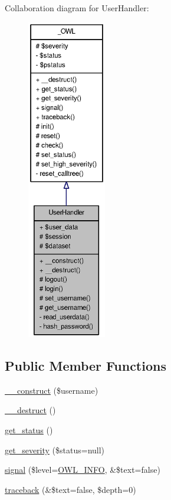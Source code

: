 Collaboration diagram for UserHandler:\nopagebreak
\begin{figure}[H]
\begin{center}
\leavevmode
\includegraphics[height=400pt]{classUserHandler__coll__graph}
\end{center}
\end{figure}
\subsection*{Public Member Functions}
\begin{DoxyCompactItemize}
\item 
\hyperlink{classUserHandler_a624054e9693139a3fe5af0ef3b757f04}{\_\-\_\-construct} (\$username)
\item 
\hyperlink{classUserHandler_a3e1f6381ed79caf6e1a255fb0a9cc386}{\_\-\_\-destruct} ()
\item 
\hyperlink{class__OWL_a99ec771fa2c5c279f80152cc09e489a8}{get\_\-status} ()
\item 
\hyperlink{class__OWL_adf9509ef96858be7bdd9414c5ef129aa}{get\_\-severity} (\$status=null)
\item 
\hyperlink{class__OWL_a51ba4a16409acf2a2f61f286939091a5}{signal} (\$level=\hyperlink{owl_8severitycodes_8php_a139328861128689f2f4def6a399d9057}{OWL\_\-INFO}, \&\$text=false)
\item 
\hyperlink{class__OWL_aa29547995d6741b7d2b90c1d4ea99a13}{traceback} (\&\$text=false, \$depth=0)
\end{DoxyCompactItemize}
